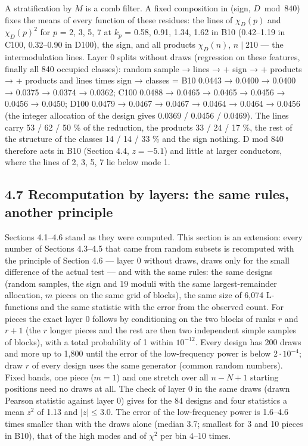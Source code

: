 \documentclass[
  10pt,
]{article}
\begin{document}
A stratification by \(M\) is a comb filter. A fixed composition in
(sign, \(D \bmod 840\)) fixes the means of every function of these
residues: the lines of \(\chi_D(p)\) and \(\chi_D(p)^2\) for \(p\) = 2,
3, 5, 7 at \(k_p\) = 0.58, 0.91, 1.34, 1.62 in B10 (0.42--1.19 in C100,
0.32--0.90 in D100), the sign, and all products \(\chi_D(n)\),
\(n \mid 210\) --- the intermodulation lines. Layer 0 splits without
draws (regression on these features, finally all 840 occupied classes):
random sample → lines → + sign → + products → + products and lines times
sign → classes = B10 0.0443 → 0.0400 → 0.0400 → 0.0375 → 0.0374 →
0.0362; C100 0.0488 → 0.0465 → 0.0465 → 0.0456 → 0.0456 → 0.0450; D100
0.0479 → 0.0467 → 0.0467 → 0.0464 → 0.0464 → 0.0456 (the integer
allocation of the design gives 0.0369 / 0.0456 / 0.0469). The lines
carry 53 / 62 / 50 \% of the reduction, the products 33 / 24 / 17 \%,
the rest of the structure of the classes 14 / 14 / 33 \% and the sign
nothing. D mod 840 therefore acts in B10 (Section 4.4, \(z = -5.1\)) and
little at larger conductors, where the lines of 2, 3, 5, 7 lie below
mode 1.

\hypertarget{recomputation-by-layers-the-same-rules-another-principle}{%
\subsection{4.7 Recomputation by layers: the same rules, another
principle}\label{recomputation-by-layers-the-same-rules-another-principle}}

Sections 4.1--4.6 stand as they were computed. This section is an
extension: every number of Sections 4.3--4.5 that came from random
subsets is recomputed with the principle of Section 4.6 --- layer 0
without draws, draws only for the small difference of the actual test
--- and with the same rules: the same designs (random samples, the sign
and 19 moduli with the same largest-remainder allocation, \(m\) pieces
on the same grid of blocks), the same size of 6,074 L-functions and the
same statistic with the error from the observed count. For pieces the
exact layer 0 follows by conditioning on the two blocks of ranks \(r\)
and \(r + 1\) (the \(r\) longer pieces and the rest are then two
independent simple samples of blocks), with a total probability of 1
within \(10^{-12}\). Every design has 200 draws and more up to 1,800
until the error of the low-frequency power is below \(2\cdot10^{-4}\);
draw \(r\) of every design uses the same generator (common random
numbers). Fixed bands, one piece (\(m = 1\)) and one stretch over all
\(n - N + 1\) starting positions need no draws at all. The check of
layer 0 in the same draws (drawn Pearson statistic against layer 0)
gives for the 84 designs and four statistics a mean \(z^2\) of 1.13 and
\(|z| \le 3.0\). The error of the low-frequency power is 1.6--4.6 times
smaller than with the draws alone (median 3.7; smallest for 3 and 10
pieces in B10), that of the high modes and of \(\chi^2\) per bin 4--10
times.
\end{document}

